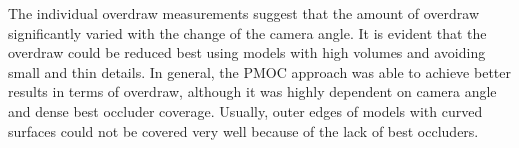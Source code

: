 \noindent
The individual overdraw measurements suggest that the amount of overdraw significantly varied with the 
change of the camera angle. It is evident that the overdraw could be reduced best using models with high 
volumes and avoiding small and thin details. In general, the \ac{PMOC} approach was able to achieve 
better results in terms of overdraw, although it was highly dependent on camera angle and dense best 
occluder coverage. Usually, outer edges of models with curved surfaces could not be covered very well 
because of the lack of best occluders. \\
